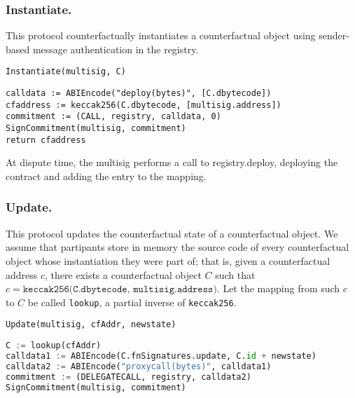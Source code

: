 \documentclass[prb,floatfix,reprint,nofootinbib,amsmath,amssymb,epsfig,pre,floats,letterpaper,groupedaffiliation,tightenlines,allcolors=blue,11pt]{revtex4}
\theoremstyle{definition}
\theoremstyle{definition}
\theoremstyle{definition}
\begin{document}
\subsubsection{Instantiate.} This protocol counterfactually instantiates a counterfactual object using sender-based message authentication in the registry.

\vspace{1.5em}
\begin{protocol}{\texttt{Instantiate(multisig, C)}}
\begin{lstlisting}
calldata := ABIEncode("deploy(bytes)", [C.dbytecode])
cfaddress := keccak256(C.dbytecode, [multisig.address])
commitment := (CALL, registry, calldata, 0)
SignCommitment(multisig, commitment)
return cfaddress
\end{lstlisting}
\end{protocol}
\vspace{1.5em}

At dispute time, the multisig performs a call to registry.deploy, deploying the contract and adding the entry to the mapping.

\begin{figure}[H]
    \centering
    
\end{figure}

\subsubsection{Update.} This protocol updates the counterfactual state of a counterfactual object. We assume that partipants store in memory the source code of every counterfactual object whose instantiation they were part of; that is, given a counterfactual address $c$, there exists a counterfactual object $C$ such that $c = \texttt{keccak256(C.dbytecode, multisig.address)}$. Let the mapping from such $c$ to $C$ be called \texttt{lookup}, a partial inverse of \texttt{keccak256}.

\vspace{1.5em}
\begin{protocol}{\texttt{Update(multisig, cfAddr, newstate)}}
\begin{lstlisting}[language=Python]
C := lookup(cfAddr)
calldata1 := ABIEncode(C.fnSignatures.update, C.id + newstate)
calldata2 := ABIEncode("proxycall(bytes)", calldata1)
commitment := (DELEGATECALL, registry, calldata2)
SignCommitment(multisig, commitment)
\end{lstlisting}
\end{protocol}
\vspace{1.5em}
\end{document}
